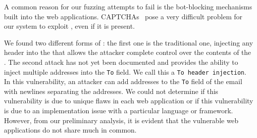 
	

	A common reason for our fuzzing attempts to fail is the bot-blocking mechanisms built into the web applications. CAPTCHAs~\cite{captchas2} pose a very difficult problem for our system to exploit \ehi, even if it is present.

    
    We found two different forms of \ehi: the first one is the traditional one, injecting any header into the \email that allows the attacker complete control over the contents of the \email. 
The second attack has not yet been documented and provides the ability to inject multiple \email addresses into the \texttt{To} field. We call this a \texttt{To header injection}. In this  vulnerability, an attacker can add addresses to the \texttt{To} field of the email with newlines separating the \email addresses. We could not determine if this vulnerability is due to unique flaws in each web application or if this vulnerability is due to an implementation issue with a particular language or framework. However, from our preliminary analysis, it is evident that the vulnerable web applications do not share much in common. 

